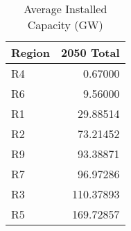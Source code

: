 \documentclass[border=1mm, preview]{standalone}
\begin{document}
\begin{table}[!h]

\caption{\label{tab:unnamed-chunk-8}Average Installed Capacity (GW)}
\centering
\begin{tabular}{lr}
\toprule
Region & 2050 Total\\
\midrule
\rowcolor{gray!6}  R4 & 0.67000\\
R6 & 9.56000\\
\rowcolor{gray!6}  R1 & 29.88514\\
R2 & 73.21452\\
\rowcolor{gray!6}  R9 & 93.38871\\
R7 & 96.97286\\
\rowcolor{gray!6}  R3 & 110.37893\\
R5 & 169.72857\\
\bottomrule
\end{tabular}
\end{table}
\end{document}
